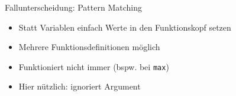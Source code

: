\documentclass{beamer}
\newcommand{\code}[1]{
	\begin{mdframed}
		
	\end{mdframed}
}
\begin{document}
\begin{frame}{Fallunterscheidung: Pattern Matching}
	\code{demos/Bool.hs}

	\begin{itemize}
		\item Statt Variablen einfach Werte in den Funktionskopf setzen
		\item Mehrere Funktionsdefinitionen möglich
		\item Funktioniert nicht immer (bspw. bei \texttt{max})
		\item Hier nützlich: \texttt{\textunderscore} ignoriert Argument
	\end{itemize}
\end{frame}
\end{document}
